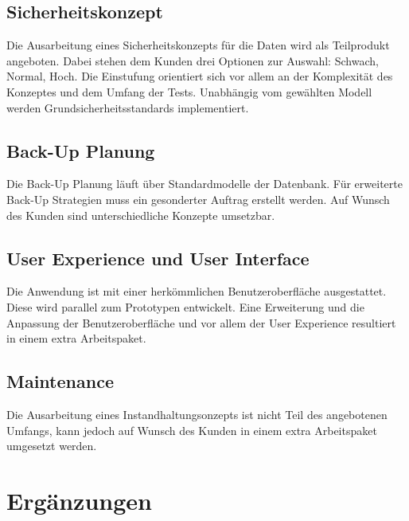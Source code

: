 	\subsection{Sicherheitskonzept}
	
	Die Ausarbeitung eines Sicherheitskonzepts für die Daten wird als Teilprodukt angeboten. Dabei stehen dem Kunden drei Optionen zur Auswahl: Schwach, Normal, Hoch. 
	Die Einstufung orientiert sich vor allem an der Komplexität des Konzeptes und dem Umfang der Tests. \newline	
	Unabhängig vom gewählten Modell werden  Grundsicherheitsstandards implementiert.
	
	\subsection{Back-Up Planung}
	
	Die Back-Up Planung läuft über Standardmodelle der Datenbank. Für erweiterte Back-Up Strategien muss ein gesonderter Auftrag erstellt werden. Auf Wunsch des Kunden sind unterschiedliche Konzepte umsetzbar.
	
	\subsection{User Experience und User Interface}
	
	Die Anwendung ist mit einer herkömmlichen Benutzeroberfläche ausgestattet. Diese wird parallel zum Prototypen entwickelt. Eine Erweiterung und die Anpassung der Benutzeroberfläche und vor allem der User Experience resultiert in einem extra Arbeitspaket.
	
	
	\subsection{Maintenance}
	
	Die Ausarbeitung eines Instandhaltungsonzepts ist nicht Teil des angebotenen Umfangs, kann jedoch auf Wunsch des Kunden in einem extra Arbeitspaket umgesetzt werden.
	
	\section{Ergänzungen}
		
	
	

